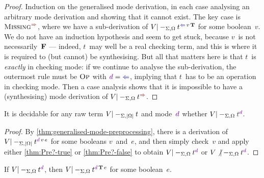 \begin{proof}
Induction on the generalised mode derivation, in each case analysing an arbitrary mode derivation and showing that it cannot exist.
The key case is $\SynRule{Missing}$, where we have a sub-derivation of $V |-_{\Sigma,\Omega} t^{\chk\,v\,\True}$ for some boolean~$v$.
We do not have an induction hypothesis and seem to get stuck, because $v$~is not necessarily~$\mathbf{F}$ --- indeed, $t$~may well be a real checking term, and this is where it is required to (but cannot) be synthesising.
But all that matters here is that $t$~is \emph{exactly} in checking mode: if we continue to analyse the sub-derivation, the outermost rule must be $\textnormal{\textsc{Op}}$ with $\dir d = {\chk}$, implying that $t$~has to be an operation in checking mode.
Then a case analysis shows that it is impossible to have a (synthesising) mode derivation of $V |-_{\Sigma,\Omega} t^{\syn}$.
\end{proof}

\begin{corollary}\label{thm:mode-preprocessing}
  It is decidable for any raw term $V |-_{\Sigma,\left|\Omega\right|} t$ and mode~$\dir{d}$ whether $V |-_{\Sigma,\Omega} \isTerm{t}^\dir{d}$.
\end{corollary}

\begin{proof}
By \cref{thm:generalised-mode-preprocessing}, there is a derivation of $V |-_{\Sigma,\erase\Omega} t^{\dir{d}\,v\,e}$ for some booleans $v$~and~$e$, and then simply check~$v$ and apply either \cref{thm:Pre?-true} or \cref{thm:Pre?-false} to obtain $V |-_{\Sigma,\Omega} t^\dir{d}$ or $V \not|-_{\Sigma,\Omega} t^\dir{d}$.
\end{proof}

\begin{corollary}\label{thm:toPre?-true}
If\/ $V |-_{\Sigma,\Omega} t^\dir{d}$, then $V |-_{\Sigma,\Omega} t^{\dir{d}\,\True\,e}$ for some boolean~$e$.
\end{corollary}

